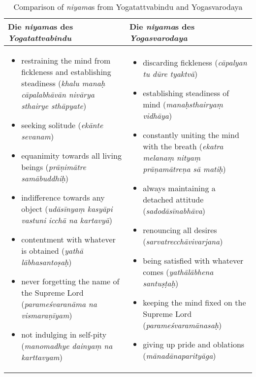 \begin{table}[H]
  \footnotesize
\centering
\begin{tabular}{|m{5cm}|m{5cm}|}
\hline
\textbf{Die \textit{niyama}s des \textit{Yogatattvabindu}} & \textbf{Die \textit{niyama}s des \textit{Yogasvarodaya}} \\
\hline
\begin{itemize}
\item restraining the mind from fickleness and establishing steadiness (\textit{khalu manaḥ cāpalabhāvān nivārya sthairye sthāpyate})
\item seeking solitude (\textit{ekānte sevanam})
\item equanimity towards all living beings (\textit{prāṇimātre samābuddhiḥ})
\item indifference towards any object (\textit{udāsīnyaṃ kasyāpi vastuni icchā na kartavyā})
\item contentment with whatever is obtained (\textit{yathā lābhasantoṣaḥ})
\item never forgetting the name of the Supreme Lord (\textit{parameśvaranāma na vismaraṇīyam})
\item not indulging in self-pity (\textit{manomadhye dainyaṃ na karttavyam})
\end{itemize}
&
\begin{itemize}
\item discarding fickleness (\textit{cāpalyan tu dūre tyaktvā})
\item establishing steadiness of mind (\textit{manaḥsthairyaṃ vidhāya})
\item constantly uniting the mind with the breath (\textit{ekatra melanaṃ nityaṃ prāṇamātreṇa sā matiḥ})
\item always maintaining a detached attitude (\textit{sadodāsīnabhāva})
\item renouncing all desires (\textit{sarvatrecchāvivarjana})
\item being satisfied with whatever comes (\textit{yathālābhena santuṣṭaḥ})
\item keeping the mind fixed on the Supreme Lord (\textit{parameśvaramānasaḥ})
\item giving up pride and oblations (\textit{mānadānaparityāga})
\end{itemize}
\\
\hline
\end{tabular}
\caption{Comparison of \textit{niyama}s from Yogatattvabindu and Yogasvarodaya}
\normalsize
\end{table}

